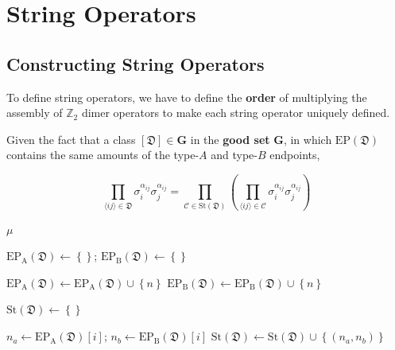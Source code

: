 \documentclass[12font]{article}
\numberwithin{equation}{section}    %
\theoremstyle{definition}
\newcommand{\anglelr}[1]{\langle #1 \rangle}
\newcommand{\lr}[1]{\left(  #1  \right)}
\newcommand{\lrm}[1]{\left[  #1  \right]}
\newcommand{\lrg}[1]{\left\{  #1  \right\}}
\newcommand{\abs}[1]{\left|  #1  \right|}
\newcommand{\mrm}[1]{\mathrm{#1}}
\newcommand{\bo}[1]{\mathbf{#1}}
\newcommand{\dimer}[2]{\sigma_{#1}^{\alpha_{#1#2}}\sigma_{#2}^{\alpha_{#1#2}}}
\begin{document}
\section{String Operators}

\subsection{Constructing String Operators}
To define string operators, we have to define the \textbf{order} of multiplying the assembly of $\mathbb{Z}_2$ dimer operators to make each string operator uniquely defined.

Given the fact that a class $[\mathfrak{D}]\in\bo{G}$ in the \textbf{good set} $\bo{G}$, in which $\mrm{EP}(\mathfrak{D})$ contains the same amounts of the type-$A$ and type-$B$ endpoints, 

\[
\prod_{\anglelr{ij}\in\mathfrak{D}}
    \dimer{i}{j}
=
\prod_{\mathcal{C} \in \mrm{St}(\mathfrak{D})}
\lr{
    \prod_{\anglelr{ij}\in\mathcal{C}}
    \dimer{i}{j}
}
\]

\begin{algorithm}[H]
\caption{Sorting lattice sites into $A$ and $B$ sublattices}\label{alg:AB-sorting}

    \begin{algorithmic}
        
            
            \State \Return $\mu$
        \EndFunction

        \State $\mrm{EP_A}(\mathfrak{D}) \gets \lrg{}$; $\mrm{EP_B}(\mathfrak{D}) \gets \lrg{}$ 

                \State $\mrm{EP_A}(\mathfrak{D}) \gets \mrm{EP_A}(\mathfrak{D}) \cup \lrg{n}$
                \State $\mrm{EP_B}(\mathfrak{D}) \gets \mrm{EP_B}(\mathfrak{D}) \cup \lrg{n}$
            \EndIf
        \EndFor
    \end{algorithmic}

\end{algorithm}

\begin{algorithm}[H]
\caption{Generate $\mrm{St}(\mathfrak{D})$}\label{alg:St-generator}

    \begin{algorithmic}
        \State $\mrm{St}(\mathfrak{D}) \gets \lrg{}$

        \For{$i=0$, $i \leq \abs{\mrm{EP}(\mathfrak{D})}/2$, $i$++}
            \State $n_a \gets \mrm{EP_A}(\mathfrak{D})\lrm{i}$; $n_b \gets \mrm{EP_B}(\mathfrak{D})\lrm{i}$
            \State $\mrm{St}(\mathfrak{D}) \gets \mrm{St}(\mathfrak{D}) \cup \lrg{(n_a,n_b)}$
        \EndFor
    \end{algorithmic}

\end{algorithm}
\end{document}
